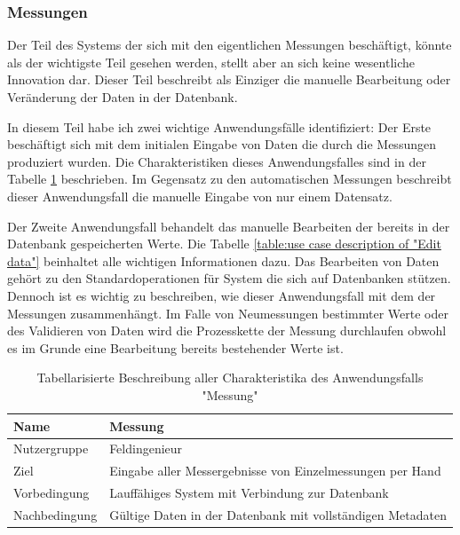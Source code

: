 \subsubsection{Messungen}
Der Teil des Systems der sich mit den eigentlichen Messungen beschäftigt, könnte als der wichtigste Teil gesehen werden, stellt aber an sich keine wesentliche Innovation dar. Dieser Teil beschreibt als Einziger die manuelle Bearbeitung oder Veränderung der Daten in der Datenbank.

In diesem Teil habe ich zwei wichtige Anwendungsfälle identifiziert: Der Erste beschäftigt sich mit dem initialen Eingabe von Daten die durch die Messungen produziert wurden. Die Charakteristiken dieses Anwendungsfalles sind in der Tabelle \ref{table:use case description of "Measure data"} beschrieben. Im Gegensatz zu den automatischen Messungen beschreibt dieser Anwendungsfall die manuelle Eingabe von nur einem Datensatz.

Der Zweite Anwendungsfall behandelt das manuelle Bearbeiten der bereits in der Datenbank gespeicherten Werte. Die Tabelle \ref{table:use case description of "Edit data"} beinhaltet alle wichtigen Informationen dazu. Das Bearbeiten von Daten gehört zu den Standardoperationen für System die sich auf Datenbanken stützen. Dennoch ist es wichtig zu beschreiben, wie dieser Anwendungsfall mit dem der Messungen zusammenhängt. Im Falle von Neumessungen bestimmter Werte oder des Validieren von Daten wird die Prozesskette der Messung durchlaufen obwohl es im Grunde eine Bearbeitung bereits bestehender Werte ist.

\begin{table}[H]
\centering
\begin{tabular}{l | p{11cm}}
Name & Messung\\ \hline 
Nutzergruppe & Feldingenieur\\ \hline 
Ziel & Eingabe aller Messergebnisse von Einzelmessungen per Hand\\ \hline 
Vorbedingung & Lauffähiges System mit Verbindung zur Datenbank\\ \hline 
Nachbedingung & Gültige Daten in der Datenbank mit vollständigen Metadaten\\ 
\end{tabular}
\caption{Tabellarisierte Beschreibung aller Charakteristika des Anwendungsfalls "Messung"} 
\label{table:use case description of "Measure data"}
\end{table}

